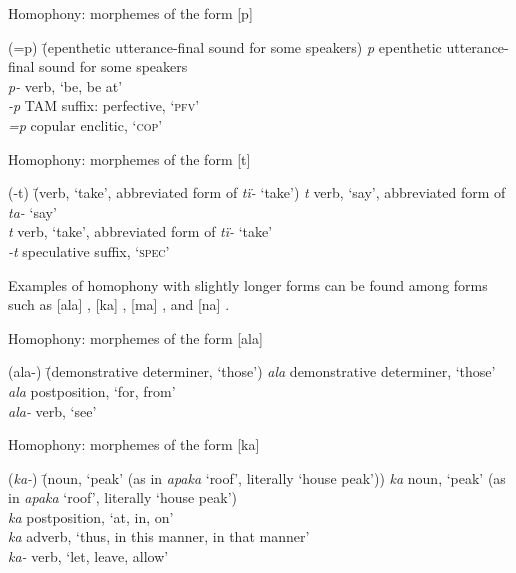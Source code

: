 \ea%
    \label{ex:sem:2b}
            Homophony: morphemes of the form [p]
\begin{tabbing}
{(=p)} \= {(epenthetic utterance-final sound for some speakers)}\kill
{\textit{p}} \> {epenthetic utterance-final sound for some speakers}\\
{\textit{p-}} \> {verb, ‘be, be at’}\\
{\textit{-p}} \> {TAM suffix: perfective, ‘\textsc{pfv}’}\\
{\textit{=p}} \> {copular enclitic, ‘\textsc{cop}’}
\end{tabbing}
\z

\ea%
    \label{ex:sem:2c}
            Homophony: morphemes of the form [t]
\begin{tabbing}
{(-t)} \= {(verb, ‘take’, abbreviated form of \textit{tï-} ‘take’)}\kill
{\textit{t}} \> {verb, ‘say’, abbreviated form of \textit{ta-} ‘say’}\\
{\textit{t}} \> {verb, ‘take’, abbreviated form of \textit{tï-} ‘take’}\\
{\textit{-t}} \> {speculative suffix, ‘\textsc{spec}’}
\end{tabbing}
\z

Examples of homophony with slightly longer  forms can be found among forms such as [ala] , [ka] , [ma] , and [na] .

\ea%
    \label{ex:sem:2d}
           Homophony: morphemes of the form [ala]
\begin{tabbing}
{(ala-)} \= {(demonstrative determiner, ‘those’)}\kill
{\textit{ala}} \> {demonstrative determiner, ‘those’}\\
{\textit{ala}} \> {postposition, ‘for, from’}\\
{\textit{ala-}} \> {verb, ‘see’}
\end{tabbing}
\z

\ea%
    \label{ex:sem:2e}
           Homophony: morphemes of the form [ka]
\begin{tabbing}
{(\textit{ka-})} \= {(noun, ‘peak’ (as in \textit{apaka} ‘roof’, literally ‘house peak’))}\kill 
{\textit{ka}} \> {noun, ‘peak’ (as in \textit{apaka} ‘roof’, literally ‘house peak’)}\\
{\textit{ka}} \> {postposition, ‘at, in, on’}\\
{\textit{ka}} \> {adverb, ‘thus, in this manner, in that manner’}\\
{\textit{ka-}} \> {verb, ‘let, leave, allow’}
\end{tabbing}
\z

